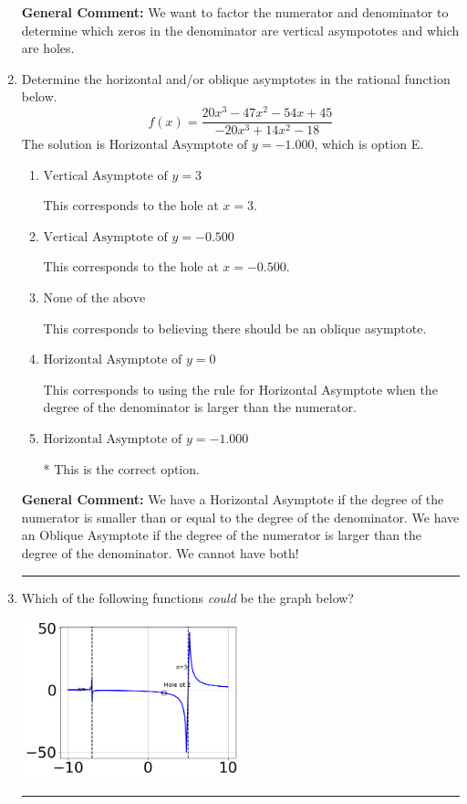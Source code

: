 \documentclass{extbook}[14pt]
\newcommand{\litem}[1]{\item #1

\rule{\textwidth}{0.4pt}}
\begin{document}
\begin{enumerate}
{\textbf{General Comment:} We want to factor the numerator and denominator to determine which zeros in the denominator are vertical asympototes and which are holes.
}
\litem{
Determine the horizontal and/or oblique asymptotes in the rational function below.
\[ f(x) = \frac{20x^{3} -47 x^{2} -54 x + 45}{-20x^{3} +14 x^{2} -18} \]The solution is \( \text{Horizontal Asymptote of } y = -1.000  \), which is option E.\begin{enumerate}[label=\Alph*.]
\item \( \text{Vertical Asymptote of } y = 3  \)

This corresponds to the hole at $x = 3$.
\item \( \text{Vertical Asymptote of } y = -0.500  \)

This corresponds to the hole at $x = -0.500$.
\item \( \text{None of the above} \)

This corresponds to believing there should be an oblique asymptote.
\item \( \text{Horizontal Asymptote of } y = 0  \)

This corresponds to using the rule for Horizontal Asymptote when the degree of the denominator is larger than the numerator.
\item \( \text{Horizontal Asymptote of } y = -1.000  \)

* This is the correct option.
\end{enumerate}

\textbf{General Comment:} We have a Horizontal Asymptote if the degree of the numerator is smaller than or equal to the degree of the denominator. We have an Oblique Asymptote if the degree of the numerator is larger than the degree of the denominator. We cannot have both!
}
\litem{
Which of the following functions \textit{could} be the graph below?

\begin{center}
    \includegraphics[width=0.5\textwidth]{../Figures/identifyGraphOfRationalFunctionC.png}
\end{center}


}
\end{enumerate}
\end{document}
